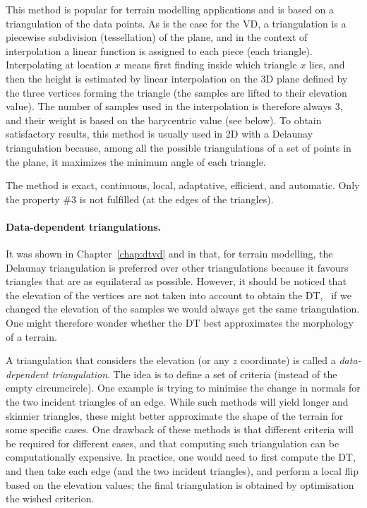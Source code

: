 This method is popular for terrain modelling applications and is based on a triangulation of the data points. 
As is the case for the VD, a triangulation is a piecewise subdivision (tessellation) of the plane, and in the context of interpolation a linear function is assigned to each piece (each triangle). 
Interpolating at location $x$ means first finding inside which triangle $x$ lies, and then the height is estimated by linear interpolation on the 3D plane defined by the three vertices forming the triangle (the samples are lifted to their elevation value). 
The number of samples used in the interpolation is therefore always 3, and their weight is based on the barycentric value (see below).
To obtain satisfactory results, this method is usually used in 2D with a Delaunay triangulation because, among all the possible triangulations of a set of points in the plane, it maximizes the minimum angle of each triangle. 

The method is exact, continuous, local, adaptative, efficient, and automatic.
Only the property \#3 is not fulfilled (at the edges of the triangles).


\paragraph{Data-dependent triangulations.}
It was shown in Chapter~\ref{chap:dtvd} and in  that, for terrain modelling, the Delaunay triangulation is preferred over other triangulations because it favours triangles that are as equilateral as possible.
However, it should be noticed that the elevation of the vertices are not taken into account to obtain the DT, \ie\ if we changed the elevation of the samples we would always get the same triangulation.
One might therefore wonder whether the DT best approximates the morphology of a terrain.

A triangulation that considers the elevation (or any $z$ coordinate) is called a \emph{data-dependent triangulation}.
The idea is to define a set of criteria (instead of the empty circumcircle).
One example is trying to minimise the change in normals for the two incident triangles of an edge.
While such methods will yield longer and skinnier triangles, these might better approximate the shape of the terrain for some specific cases.
One drawback of these methods is that different criteria will be required for different cases, and that computing such triangulation can be computationally expensive.
In practice, one would need to first compute the DT, and then take each edge (and the two incident triangles), and perform a local flip based on the elevation values; the final triangulation is obtained by optimisation the wished criterion.



